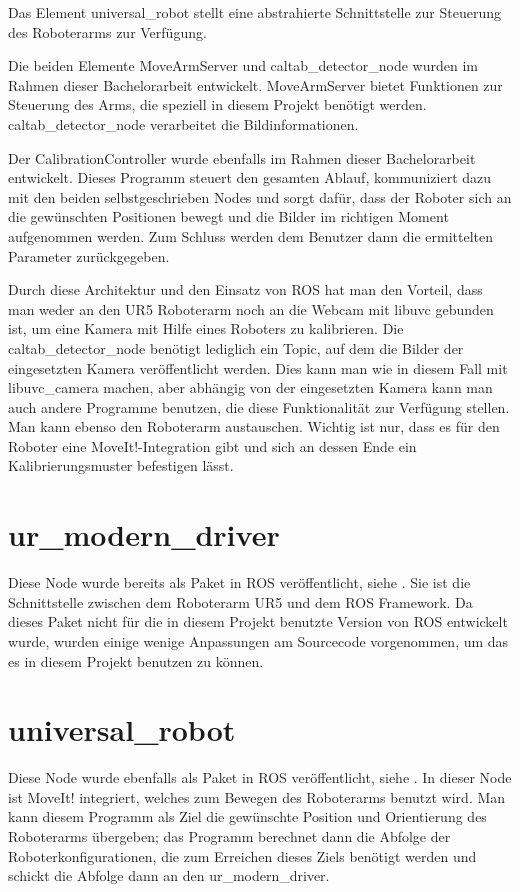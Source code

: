 Das Element universal\_robot stellt eine abstrahierte Schnittstelle zur Steuerung des Roboterarms zur Verfügung.

Die beiden Elemente MoveArmServer und caltab\_detector\_node wurden im Rahmen dieser Bachelorarbeit entwickelt. MoveArmServer bietet Funktionen zur Steuerung des Arms, die speziell in diesem Projekt benötigt werden. caltab\_detector\_node verarbeitet die Bildinformationen.

Der CalibrationController wurde ebenfalls im Rahmen dieser Bachelorarbeit entwickelt. Dieses Programm steuert den gesamten Ablauf, kommuniziert dazu mit den beiden selbstgeschrieben Nodes und sorgt dafür, dass der Roboter sich an die gewünschten Positionen bewegt und die Bilder im richtigen Moment aufgenommen werden. Zum Schluss werden dem Benutzer dann die ermittelten Parameter zurückgegeben.

Durch diese Architektur und den Einsatz von ROS hat man den Vorteil, dass man weder an den UR5 Roboterarm noch an die Webcam mit libuvc gebunden ist, um eine Kamera mit Hilfe eines Roboters zu kalibrieren. Die caltab\_detector\_node benötigt lediglich ein Topic, auf dem die Bilder der eingesetzten Kamera veröffentlicht werden. Dies kann man wie in diesem Fall mit libuvc\_camera machen, aber abhängig von der eingesetzten Kamera kann man auch andere Programme benutzen, die diese Funktionalität zur Verfügung stellen. Man kann ebenso den Roboterarm austauschen. Wichtig ist nur, dass es für den Roboter eine MoveIt!-Integration gibt und sich an dessen Ende ein Kalibrierungsmuster befestigen lässt. 

\section{ur\_modern\_driver} %
\label{sec:ur_modern_driver}
Diese Node wurde bereits als Paket in ROS veröffentlicht, siehe \cite{ur_modern_driver}. Sie ist die Schnittstelle zwischen dem Roboterarm UR5 und dem ROS Framework. Da dieses Paket nicht für die in diesem Projekt benutzte Version von ROS entwickelt wurde, wurden einige wenige Anpassungen am Sourcecode vorgenommen, um das es in diesem Projekt benutzen zu können.

\section{universal\_robot} %
\label{sec:universal_robot}
Diese Node wurde ebenfalls als Paket in ROS veröffentlicht, siehe \cite{universal_robot}. In dieser Node ist MoveIt! integriert, welches zum Bewegen des Roboterarms benutzt wird. Man kann diesem Programm als Ziel die gewünschte Position und Orientierung des Roboterarms übergeben; das Programm berechnet dann die Abfolge der Roboterkonfigurationen, die zum Erreichen dieses Ziels benötigt werden und schickt die Abfolge dann an den ur\_modern\_driver. 

